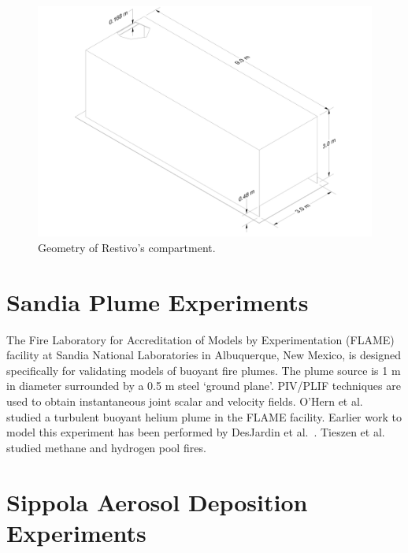 \begin{figure}[ht]
\includegraphics[width=\textwidth]{FIGURES/Restivo_Experiment/Restivo_Drawing}
\caption[Geometry of Restivo's compartment]{Geometry of Restivo's compartment.}
\label{Restivo_Drawing}
\end{figure}

\section{Sandia Plume Experiments}

The Fire Laboratory for Accreditation of Models by Experimentation (FLAME) facility \cite{OHern:2005,Blanchat:2001} at Sandia National Laboratories in Albuquerque, New Mexico, is designed specifically for validating models of buoyant fire plumes.  The plume source is 1 m in diameter surrounded by a 0.5 m steel `ground plane'. PIV/PLIF techniques are used to obtain instantaneous joint scalar and velocity fields.  O'Hern et al.~\cite{OHern:2005} studied a turbulent buoyant helium plume in the FLAME facility. Earlier work to model this experiment has been performed by DesJardin et al.~\cite{DesJardin:2004}. Tieszen et al.~\cite{Tieszen:2004,Tieszen:2002} studied methane and hydrogen pool fires.

\section{Sippola Aerosol Deposition Experiments}

